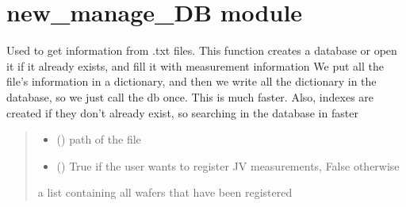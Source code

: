\documentclass[letterpaper,10pt,english]{sphinxmanual}
\begin{document}
\section{new\_manage\_DB module}
\label{\detokenize{new_manage_DB:module-new_manage_DB}}\label{\detokenize{new_manage_DB:new-manage-db-module}}\label{\detokenize{new_manage_DB::doc}}

\begin{fulllineitems}
\label{\detokenize{new_manage_DB:new_manage_DB.create_db}}
\pysigstartsignatures
{}
\pysigstopsignatures
\sphinxAtStartPar
Used to get information from .txt files.
This function creates a database or open it if it already exists, and fill it with measurement information
We put all the file’s information in a dictionary, and then we write all the dictionary in the database, so we just call the db once.
This is much faster.
Also, indexes are created if they don’t already exist, so searching in the database in faster
\begin{quote}\begin{description}
\begin{itemize}
\item {} 
\sphinxAtStartPar
{} () \textendash{} path of the file

\item {} 
\sphinxAtStartPar
{} () \textendash{} True if the user wants to register J\sphinxhyphen{}V measurements, False otherwise

\end{itemize}

\sphinxAtStartPar
a list containing all wafers that have been registered

\end{description}\end{quote}

\end{fulllineitems}
\end{document}

